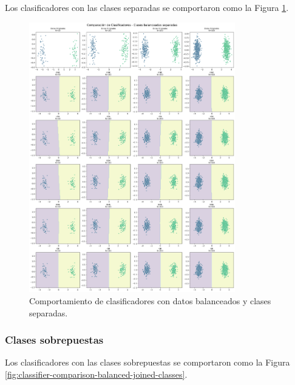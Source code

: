 \documentclass[10pt]{article}
\begin{document}
Los clasificadores con las clases separadas se comportaron como la Figura
\ref{fig:classifier-comparison-balanced-separated-classes}.
\begin{figure}[ht]
    \centering
    \includegraphics[width=0.8\textwidth]{./Parte 2/figures/classifier_comparison_balanced_separated_classes.png}
    \caption{Comportamiento de clasificadores con datos balanceados y clases separadas.}    
    \label{fig:classifier-comparison-balanced-separated-classes}
\end{figure}

\subsubsection*{Clases sobrepuestas}

Los clasificadores con las clases sobrepuestas se comportaron como la Figura
\ref{fig:classifier-comparison-balanced-joined-classes}.
\end{document}
